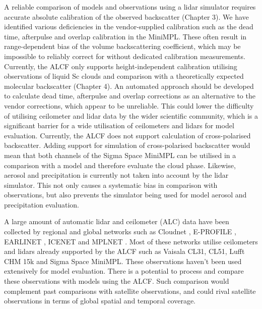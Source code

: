 A reliable comparison of models and observations using a lidar simulator
requires accurate absolute calibration of the observed backscatter
(Chapter 3). We have identified various deficiencies in the vendor-supplied
calibration such as the dead time, afterpulse and overlap calibration in
the MiniMPL. These often result in range-dependent bias of the volume
backscattering coefficient, which may be impossible to reliably correct
for without dedicated calibration measurements. Currently, the ALCF only
supports height-independent calibration utilising observations of liquid
Sc clouds and comparison with a theoretically expected
molecular backscatter (Chapter 4). An automated approach should be developed to calculate
dead time, afterpulse and overlap corrections as an alternative to the 
vendor corrections, which appear to be unreliable. This could lower the
difficulty of utilising ceilometer and lidar data by the wider scientific
community, which is a significant barrier for a wide utilisation of ceilometers
and lidars for model evaluation.
Currently, the ALCF does not support calculation of cross-polarised
backscatter. Adding support for simulation of cross-polarised backscatter
would mean that both channels of the Sigma Space MiniMPL can be utilised
in a comparison with a model and therefore evaluate the cloud phase.
Likewise, aerosol and precipitation is currently not taken into account
by the lidar simulator. This not only causes a systematic bias in comparison
with observations, but also prevents the simulator being used for
model aerosol and precipitation evaluation.

A large amount of automatic lidar and ceilometer (ALC) data have been collected by regional and global
networks such as Cloudnet \citep{illingworth2007},
E-PROFILE \citep{illingworth2018}, EARLINET
\citep{pappalardo2014}, ICENET \citep{cazorla2017} and MPLNET
\citep{welton2006}. Most of these networks utilise ceilometers
and lidars already supported by the ALCF such as Vaisala CL31, CL51, Lufft CHM
15k and Sigma Space MiniMPL. These observations haven't been used
extensively for model evaluation. There is a potential to process and compare
these observations with models using the ALCF. Such comparison would complement
past comparisons with satellite observations, and could rival satellite
observations in terms of global spatial and temporal coverage. 

